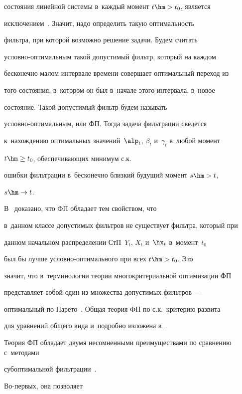 состояния линейной системы в~каждый момент $t\hm>t_0$, является


исключением~\cite{2-sin}. Значит, надо определить такую оптимальность


фильтра, при которой возможно решение задачи. Будем считать


услов\-но-оп\-ти\-маль\-ным такой допустимый фильтр, который на каждом


бесконечно малом интервале времени совершает оптимальный переход из


того состояния, в~котором он был в~начале этого интервала, в~новое


со\-сто\-яние. Такой допустимый фильтр будем называть


услов\-но-оп\-ти\-маль\-ным, или  ФП. Тогда задача фильт\-ра\-ции сведется 


к~нахождению оптимальных значений~$\alp_t$, $\beta_t$ и~$\gamma_t$ в~любой момент  


$t\hm\ge t_0$, обеспечивающих минимум с.к.\ 


ошибки фильт\-ра\-ции в~бесконечно близкий будущий момент  $s\hm> t$,


$s\hm\to t$. 





В~\cite{2-sin} доказано, что ФП обладает тем свойством, что 


в~данном классе допустимых фильт\-ров не существует фильт\-ра, который при


данном начальном распределении СтП~$Y_t$, $X_t$ и~$\hx_t$ в~момент~$t_0$ 


был бы лучше услов\-но-оп\-ти\-маль\-но\-го при всех  $t\hm>t_0$. Это


значит, что в~терминологии теории многокритериальной оптимизации ФП


представляет собой один из множества допустимых фильт\-ров~---


оптимальный по Парето~\cite{4-sin}. Общая теория ФП по с.к.\ критерию развита


для уравнений общего вида и~подробно изложена в~\cite{2-sin}.





Теория ФП обладает двумя несомненными преимуществами по сравнению с~методами


субоптимальной фильтрации~\cite{2-sin}. 





Во-пер\-вых, она позволяет


